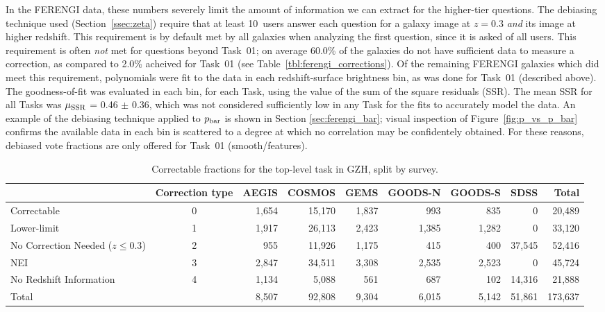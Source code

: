 \documentclass[twocolumn]{aastex6}
\begin{document}
In the FERENGI data, these numbers severely limit the amount of information we can extract for the higher-tier questions. The debiasing technique used (Section~\ref{ssec:zeta}) require that at least 10~users answer each question for a galaxy image at $z=0.3$ \emph{and} its image at higher redshift. This requirement is by default met by all galaxies when analyzing the first question, since it is asked of all users. This requirement is often \emph{not} met for questions beyond Task~01; on average 60.0\% of the galaxies do not have sufficient data to measure a correction, as compared to 2.0\% acheived for Task~01 (see Table~\ref{tbl:ferengi_corrections}). Of the remaining FERENGI galaxies which did meet this requirement, polynomials were fit to the data in each redshift-surface brightness bin, as was done for Task~01 (described above). The goodness-of-fit was evaluated in each bin, for each Task, using the value of the sum of the square residuals (SSR). The mean SSR for all Tasks was $\mu_{\rm SSR}$ = 0.46 $\pm$ 0.36, which was not considered sufficiently low in any Task for the fits to accurately model the data. An example of the debiasing technique applied to $p_{\rm bar}$ is shown in Section \ref{sec:ferengi_bar}; visual inspection of Figure~\ref{fig:p_vs_p_bar} confirms the available data in each bin is scattered to a degree at which no correlation may be confidentely obtained. For these reasons, debiased vote fractions are only offered for Task~01 (smooth/features).  


\begin{table}
\caption{Correctable fractions for the top-level task in GZH, split by survey.}\label{tbl:hubble_debiasable}
\begin{tabular}{lcrrrrrrr}
\hline\hline
                                   & Correction type & AEGIS   & COSMOS & GEMS & GOODS-N & GOODS-S    & SDSS    & Total \\
\hline
Correctable                        & 0               & 1,654   & 15,170 & 1,837 & 993    & 835     	& 0       & 20,489\\
Lower-limit                        & 1               & 1,917   & 26,113 & 2,423 & 1,385  & 1,282   	& 0       & 33,120\\
No Correction Needed ($z \le 0.3$) & 2               & 955     & 11,926 & 1,175 & 415    & 400     	& 37,545  & 52,416\\ 
NEI                                & 3               & 2,847   & 34,511 & 3,308 & 2,535  & 2,523   	& 0       & 45,724\\
No Redshift Information            & 4               & 1,134   & 5,088  & 561   & 687    & 102   		& 14,316  & 21,888\\
Total                              &                 & 8,507   & 92,808 & 9,304 & 6,015  & 5,142   	& 51,861  & 173,637\\
\hline\hline
\end{tabular}
\end{table}
\end{document}
